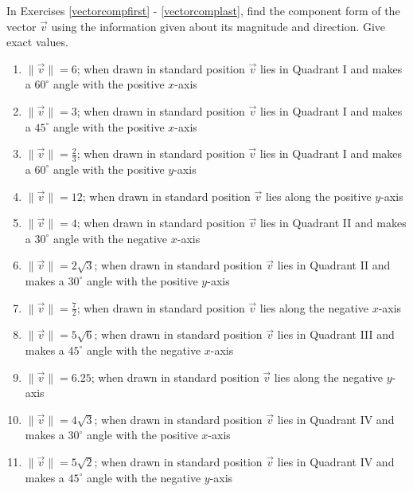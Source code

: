 In Exercises \ref{vectorcompfirst} - \ref{vectorcomplast}, find the component form of the vector $\vec{v}$ using the information given about its magnitude and direction.  Give exact values.

\begin{enumerate}

\setcounter{enumi}{\value{HW}}

\item $\|\vec{v}\| = 6$; when drawn in standard position $\vec{v}$ lies in Quadrant I and makes a $60^{\circ}$ angle with the positive $x$-axis \label{vectorcompfirst}

\item $\|\vec{v}\| = 3$; when drawn in standard position $\vec{v}$ lies in Quadrant I and makes a $45^{\circ}$ angle with the positive $x$-axis

\item $\|\vec{v}\| = \frac{2}{3}$; when drawn in standard position $\vec{v}$ lies in Quadrant I and makes a $60^{\circ}$ angle with the positive $y$-axis

\item $\|\vec{v}\| = 12$; when drawn in standard position $\vec{v}$ lies along the positive $y$-axis

\item $\|\vec{v}\| = 4$; when drawn in standard position $\vec{v}$ lies in Quadrant II and makes a $30^{\circ}$ angle with the negative $x$-axis

\item $\|\vec{v}\| = 2\sqrt{3}$; when drawn in standard position $\vec{v}$ lies in Quadrant II and makes a $30^{\circ}$ angle with the positive $y$-axis

\item $\|\vec{v}\| = \frac{7}{2}$; when drawn in standard position $\vec{v}$ lies along the negative $x$-axis

\item $\|\vec{v}\| = 5\sqrt{6}$; when drawn in standard position $\vec{v}$ lies in Quadrant III and makes a $45^{\circ}$ angle with the negative $x$-axis

\item $\|\vec{v}\| = 6.25$; when drawn in standard position $\vec{v}$ lies along the negative $y$-axis

\item $\|\vec{v}\| = 4\sqrt{3}$; when drawn in standard position $\vec{v}$ lies in Quadrant IV and makes a $30^{\circ}$ angle with the positive $x$-axis

\item $\|\vec{v}\| = 5\sqrt{2}$; when drawn in standard position $\vec{v}$ lies in Quadrant IV and makes a $45^{\circ}$ angle with the negative $y$-axis


\end{enumerate}
